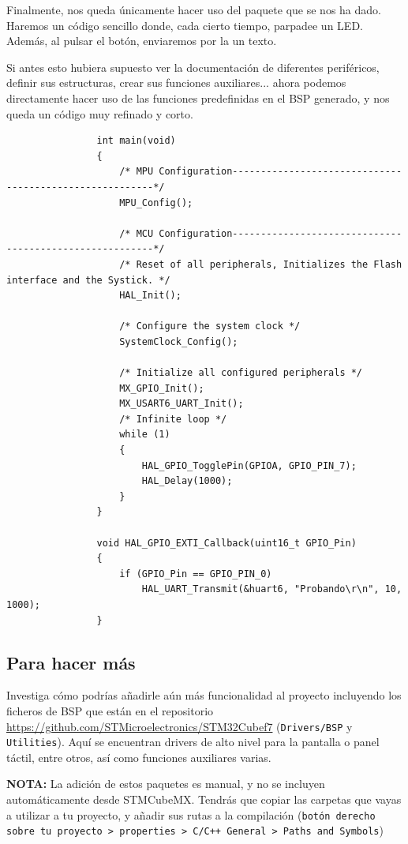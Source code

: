 \documentclass[../main.tex]{subfiles}
\begin{document}
            Finalmente, nos queda únicamente hacer uso del paquete que se nos ha dado. Haremos un código sencillo donde, cada cierto tiempo, parpadee un LED. Además, al pulsar el botón, enviaremos por la  un texto.

            Si antes esto hubiera supuesto ver la documentación de diferentes periféricos, definir sus estructuras, crear sus funciones auxiliares... ahora podemos directamente hacer uso de las funciones predefinidas en el BSP generado, y nos queda un código muy refinado y corto.

            \begin{lstlisting}
                int main(void)
                {
                    /* MPU Configuration--------------------------------------------------------*/
                    MPU_Config();

                    /* MCU Configuration--------------------------------------------------------*/
                    /* Reset of all peripherals, Initializes the Flash interface and the Systick. */
                    HAL_Init();

                    /* Configure the system clock */
                    SystemClock_Config();

                    /* Initialize all configured peripherals */
                    MX_GPIO_Init();
                    MX_USART6_UART_Init();
                    /* Infinite loop */
                    while (1)
                    {
                        HAL_GPIO_TogglePin(GPIOA, GPIO_PIN_7);
                        HAL_Delay(1000);
                    }
                }

                void HAL_GPIO_EXTI_Callback(uint16_t GPIO_Pin)
                {
                    if (GPIO_Pin == GPIO_PIN_0)
                        HAL_UART_Transmit(&huart6, "Probando\r\n", 10, 1000);
                }
            \end{lstlisting}
            
    
    \subsection{Para hacer más}

        Investiga cómo podrías añadirle aún más funcionalidad al proyecto incluyendo los ficheros de BSP que están en el repositorio \url{https://github.com/STMicroelectronics/STM32Cubef7} (\texttt{Drivers/BSP} y \texttt{Utilities}). Aquí se encuentran drivers de alto nivel para la pantalla o panel táctil, entre otros, así como funciones auxiliares varias.

        \textbf{NOTA:} La adición de estos paquetes es manual, y no se incluyen automáticamente desde STMCubeMX. Tendrás que copiar las carpetas que vayas a utilizar a tu proyecto, y añadir sus rutas a la compilación (\texttt{botón derecho sobre tu proyecto > properties > C/C++ General > Paths and Symbols})

            
\end{document}
